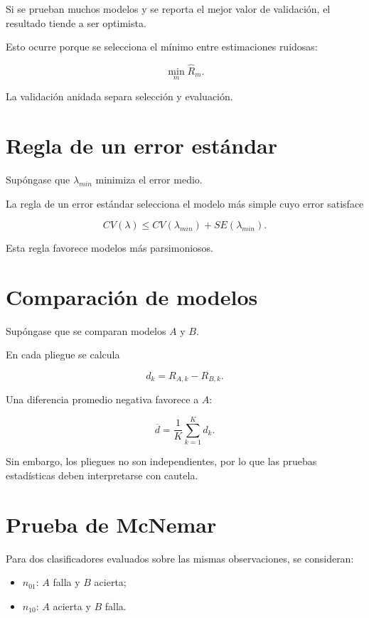 \documentclass[
  spanish,
  11pt,
  letterpaper,
  DIV=11,
  numbers=noendperiod]{scrreprt}
\providecommand{\tightlist}{%
  \setlength{\itemsep}{0pt}\setlength{\parskip}{0pt}}
\theoremstyle{definition}
\theoremstyle{plain}
\theoremstyle{definition}
\theoremstyle{remark}
\begin{document}
Si se prueban muchos modelos y se reporta el mejor valor de validación,
el resultado tiende a ser optimista.

Esto ocurre porque se selecciona el mínimo entre estimaciones ruidosas:

\[
\min_m
\widehat{R}_m.
\]

La validación anidada separa selección y evaluación.

\section{Regla de un error
estándar}\label{regla-de-un-error-estuxe1ndar}

Supóngase que \(\lambda_{min}\) minimiza el error medio.

La regla de un error estándar selecciona el modelo más simple cuyo error
satisface

\[
CV(\lambda)
\leq
CV(\lambda_{min})
+
SE(\lambda_{min}).
\]

Esta regla favorece modelos más parsimoniosos.

\section{Comparación de modelos}\label{comparaciuxf3n-de-modelos}

Supóngase que se comparan modelos \(A\) y \(B\).

En cada pliegue se calcula

\[
d_k
=
R_{A,k}
-
R_{B,k}.
\]

Una diferencia promedio negativa favorece a \(A\):

\[
\overline{d}
=
\frac{1}{K}
\sum_{k=1}^{K}d_k.
\]

Sin embargo, los pliegues no son independientes, por lo que las pruebas
estadísticas deben interpretarse con cautela.

\section{Prueba de McNemar}\label{prueba-de-mcnemar}

Para dos clasificadores evaluados sobre las mismas observaciones, se
consideran:

\begin{itemize}
\tightlist
\item
  \(n_{01}\): \(A\) falla y \(B\) acierta;
\item
  \(n_{10}\): \(A\) acierta y \(B\) falla.
\end{itemize}
\end{document}
